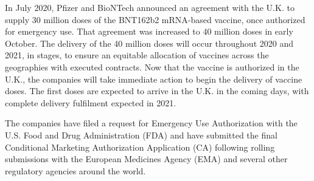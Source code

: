 In July 2020, Pfizer and BioNTech announced an agreement with the U.K. to
supply 30 million doses of the BNT162b2 mRNA-based vaccine, once authorized for
emergency use. That agreement was increased to 40 million doses in early
October. The delivery of the 40 million doses will occur throughout 2020 and
2021, in stages, to ensure an equitable allocation of vaccines across the
geographies with executed contracts. Now that the vaccine is authorized in the
U.K., the companies will take immediate action to begin the delivery of vaccine
doses. The first doses are expected to arrive in the U.K. in the coming days,
with complete delivery fulfilment expected in 2021.

The companies have filed a request for Emergency Use Authorization with the
U.S. Food and Drug Administration (FDA) and have submitted the final
Conditional Marketing Authorization Application (CA) following rolling
submissions with the European Medicines Agency (EMA) and several other
regulatory agencies around the world.


